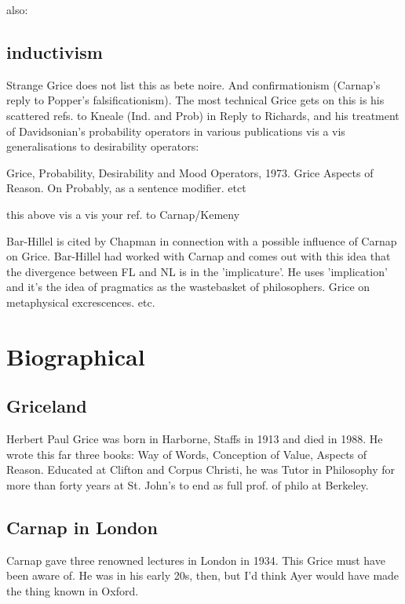 \documentclass[10pt,titlepage]{book}
\begin{document}
{also:
 
\subsection{inductivism}

Strange Grice does not list this as bete noire. And  
confirmationism (Carnap's reply to Popper's falsificationism). The most  technical 
Grice gets on this is his scattered refs. to Kneale (Ind. and Prob) in  Reply 
to Richards, and his treatment of Davidsonian's probability operators in  
various publications vis a vis generalisations to desirability operators: 
 
Grice, Probability, Desirability and Mood Operators, 1973.
Grice Aspects of Reason. On Probably, as a sentence modifier. etct
 
this above vis a vis your ref. to Carnap/Kemeny
 
 
Bar-Hillel is cited by Chapman in connection with a possible influence of  
Carnap on Grice. Bar-Hillel had worked with Carnap and comes out with this 
idea  that the divergence between FL and NL is in the 'implicature'. He uses  
'implication' and it's the idea of pragmatics as the wastebasket of  
philosophers. Grice on metaphysical excrescences. etc. 
 
 
\section{Biographical}

\subsection{Griceland}

Herbert Paul Grice was born in Harborne, Staffs 
in 1913 and died in  1988. He wrote this far three books: Way of Words, 
Conception of Value, Aspects  of Reason. Educated at Clifton and Corpus Christi, 
he was Tutor in Philosophy for more than forty years at St. John's to end as full prof. of philo at Berkeley.

\subsection{Carnap in London}

Carnap gave three renowned lectures in London in 1934.
This  Grice must have been aware of. He was in his early 
20s, then, but I’d think Ayer  would have made the thing known in Oxford.
 
}
\end{document}
